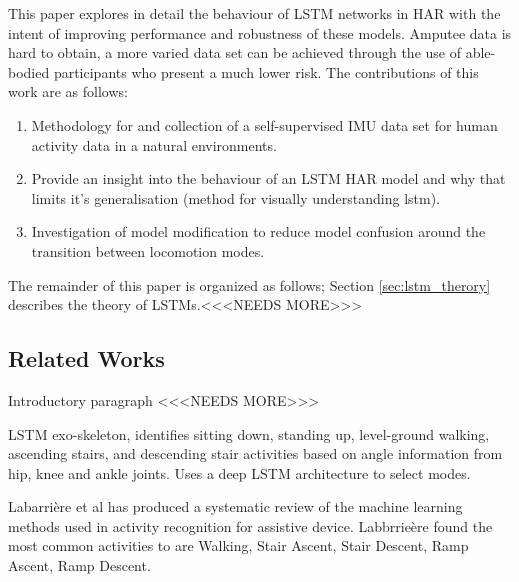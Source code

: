 \documentclass[sensors,article,submit,moreauthors,pdftex]{Definitions/mdpi}
\begin{document}
This paper explores in detail the behaviour of LSTM networks in HAR with the intent of improving performance and robustness of these models. Amputee data is hard to obtain, a more varied data set can be achieved through the use of able-bodied participants who present a much lower risk. The contributions of this work are as follows:
\begin{enumerate}
\item Methodology for and collection of a self-supervised IMU data set for human activity data in a natural environments.
\item Provide an insight into the behaviour of an LSTM HAR model and why that limits it's generalisation (method for visually understanding lstm).
\item Investigation of model modification to reduce model confusion around the transition between locomotion modes.
\end{enumerate}

The remainder of this paper is organized as follows; Section \ref{sec:lstm_therory} describes the theory of LSTMs.<<<NEEDS MORE>>>

\subsection{Related Works}
\label{sec:related_works}
Introductory paragraph <<<NEEDS MORE>>>

LSTM exo-skeleton\cite{Wang2018}, identifies sitting down, standing up, level-ground walking, ascending stairs, and descending stair activities based on angle information from hip, knee and ankle joints. Uses a deep LSTM architecture to select modes.

Labarri\`ere et al has produced a systematic review of the machine learning methods used in activity recognition for assistive device\cite{Labarriere2020}. Labbrrie\`ere found the most common activities to are Walking, Stair Ascent, Stair Descent, Ramp Ascent, Ramp Descent.
\end{document}
